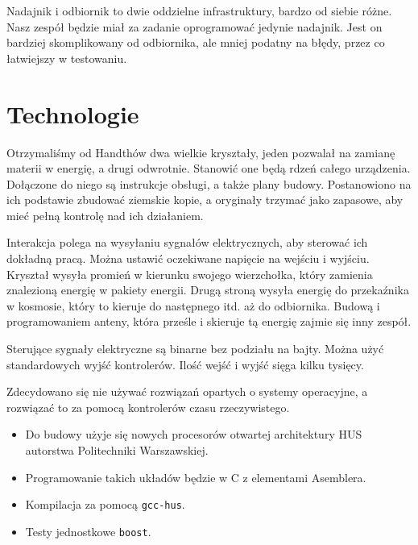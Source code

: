 Nadajnik i odbiornik to dwie oddzielne infrastruktury, bardzo od siebie różne. Nasz zespół będzie miał za zadanie oprogramować jedynie nadajnik.
Jest on bardziej skomplikowany od odbiornika, ale mniej podatny na błędy, przez co łatwiejszy w testowaniu.

\section{Technologie}
Otrzymaliśmy od Handthów dwa wielkie kryształy, jeden pozwalał na zamianę materii w energię, a drugi odwrotnie. 
Stanowić one będą rdzeń całego urządzenia. 
Dołączone do niego są instrukcje obsługi, a także plany budowy.
Postanowiono na ich podstawie zbudować ziemskie kopie, a oryginały trzymać jako zapasowe, aby mieć pełną kontrolę nad ich działaniem.

Interakcja polega na wysyłaniu sygnałów elektrycznych, aby sterować ich dokładną pracą.
Można ustawić oczekiwane napięcie na wejściu i wyjściu.
Kryształ wysyła promień w kierunku swojego wierzchołka, który zamienia znalezioną energię w pakiety energii.
Drugą stroną wysyła energię do przekaźnika w kosmosie, który to kieruje do następnego itd. aż do odbiornika.
Budową i programowaniem anteny, która prześle i skieruje tą energię zajmie się inny zespół.

Sterujące sygnały elektryczne są binarne bez podziału na bajty.
Można użyć standardowych wyjść kontrolerów.
Ilość wejść i wyjść sięga kilku tysięcy.

Zdecydowano się nie używać rozwiązań opartych o systemy operacyjne, a rozwiązać to za pomocą kontrolerów czasu rzeczywistego.
\begin{itemize}
\item Do budowy użyje się nowych procesorów otwartej architektury HUS autorstwa Politechniki Warszawskiej.
\item Programowanie takich układów będzie w C z elementami Asemblera. 
\item Kompilacja za pomocą \texttt{gcc-hus}.
\item Testy jednostkowe \texttt{boost}.
\end{itemize}
